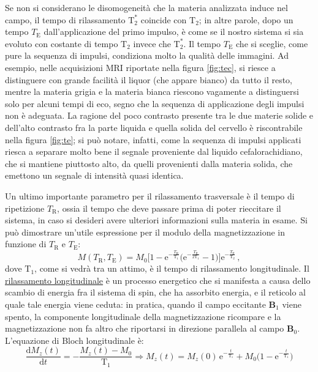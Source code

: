 \documentclass{report}
\newcommand{\figref}[1]{figura \ref{#1}}
\numberwithin{equation}{section}
\numberwithin{figure}{section}
\renewcommand{\Vec}{\bm}
\begin{document}
Se non si considerano le disomogeneità che la materia analizzata induce nel campo, il tempo di rilassamento $\mathrm{T_2^*}$ coincide con $\mathrm{T_2}$; in altre parole, dopo un tempo $T_\mathrm{E}$ dall'applicazione del primo impulso, è come se il nostro sistema si sia evoluto con costante di tempo $\mathrm{T_2}$ invece che $\mathrm{T_2^*}$. Il tempo $T_\mathrm{E}$ che si sceglie, come pure la sequenza di impulsi, condiziona molto la qualità delle immagini. Ad esempio, nelle acquisizioni MRI riportate nella \figref{fig:tec}, si riesce a distinguere con grande facilità il liquor (che appare bianco) da tutto il resto, mentre la materia grigia e la materia bianca riescono vagamente a distinguersi solo per alcuni tempi di eco, segno che la sequenza di applicazione degli impulsi non è adeguata. La ragione del poco contrasto presente tra le due materie solide e dell'alto contrasto fra la parte liquida e quella solida del cervello è riscontrabile nella \figref{fig:te}; si può notare, infatti, come la sequenza di impulsi applicati riesca a separare molto bene il segnale proveniente dal liquido cefalorachidiano, che si mantiene piuttosto alto, da quelli provenienti dalla materia solida, che emettono un segnale di intensità quasi identica.

Un ultimo importante parametro per il rilassamento trasversale è il tempo di ripetizione $T_\mathrm{R}$, ossia il tempo che deve passare prima di poter rieccitare il sistema, in caso si desideri avere ulteriori informazioni sulla materia in esame. Si può dimostrare un'utile espressione per il modulo della magnetizzazione in funzione di $T_\mathrm{R}$ e $T_\mathrm{E}$:
\begin{equation}
    M(T_\mathrm{R},T_\mathrm{E})= M_0 \Big[1-\mathrm{e}^{-\frac{T_\mathrm{R}}{\mathrm{T_1}}} \Big(\mathrm{e}^{-\frac{T_\mathrm{E}}{2\mathrm{T_1}}}-1 \Big) \Big]\mathrm{e}^{-\frac{T_\mathrm{E}}{\mathrm{T_2}}}\,,
    \label{segnale}
\end{equation}
dove $\mathrm{T_1}$, come si vedrà tra un attimo, è il tempo di rilassamento longitudinale.
\newpage
Il \underline{rilassamento longitudinale} è un processo energetico che si manifesta a causa dello scambio di energia fra il sistema di spin, che ha assorbito energia, e il reticolo al quale tale energia viene ceduta: in pratica, quando il campo eccitante $\Vec{B}_1$ viene spento, la componente longitudinale della magnetizzazione ricompare e la magnetizzazione non fa altro che riportarsi in direzione parallela al campo $\Vec{B}_0$.\\
L'equazione di Bloch longitudinale è:
\begin{equation}
    \frac{\mathrm{d}M_z(t)}{\mathrm{d}t}=-\frac{M_z(t)-M_0}{\mathrm{T_1}} \Rightarrow \boxed{M_z(t)=M_z(0)\,\mathrm{e}^{-\frac{t}{\mathrm{T_1}}}+M_0 \Big(1-\mathrm{e}^{-\frac{t}{\mathrm{T_1}}} \Big)}
\end{equation}
\end{document}
